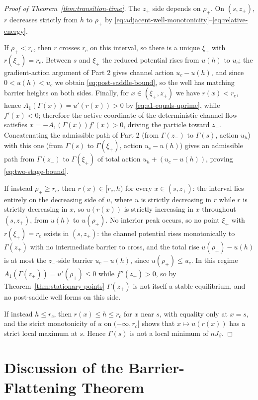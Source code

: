 \documentclass{article} %
\theoremstyle{plain}
\theoremstyle{definition}
\theoremstyle{remark}
\newcommand{\prefactor}[2]{A_{#1}(#2)}
\begin{document}
\begin{proof}[Proof of Theorem~\ref{thm:transition-time}]
    The $z_+$ side depends on $\rho_+$. On $(s,z_+)$, $r$ decreases strictly from $h$ to $\rho_+$ by \eqref{eq:adjacent-well-monotonicity}--\eqref{eq:relative-energy}.

    If $\rho_+<r_c$, then $r$ crosses $r_c$ on this interval, so there is a unique $\xi_+$ with $r(\xi_+)=r_c$. Between $s$ and $\xi_+$ the reduced potential rises from $u(h)$ to $u_c$; the gradient-action argument of Part 2 gives channel action $u_c-u(h)$, and since $0<u(h)<u_c$ we obtain \eqref{eq:post-saddle-bound}, so the well has matching barrier heights on both sides. Finally, for $x\in(\xi_+,z_+)$ we have $r(x)<r_c$, hence $\prefactor{1}{\Gamma(x)}=u'(r(x))>0$ by \eqref{eq:a1-equals-uprime}, while $f'(x)<0$; therefore the active coordinate of the deterministic channel flow satisfies $\dot x=-\prefactor{1}{\Gamma(x)}f'(x)>0$, driving the particle toward $z_+$. Concatenating the admissible path of Part 2 (from $\Gamma(z_-)$ to $\Gamma(s)$, action $u_h$) with this one (from $\Gamma(s)$ to $\Gamma(\xi_+)$, action $u_c-u(h)$) gives an admissible path from $\Gamma(z_-)$ to $\Gamma(\xi_+)$ of total action $u_h+(u_c-u(h))$, proving \eqref{eq:two-stage-bound}.

    If instead $\rho_+\ge r_c$, then $r(x)\in[r_c,h)$ for every $x\in(s,z_+)$: the interval lies entirely on the decreasing side of $u$, where $u$ is strictly decreasing in $r$ while $r$ is strictly decreasing in $x$, so $u(r(x))$ is strictly increasing in $x$ throughout $(s,z_+)$, from $u(h)$ to $u(\rho_+)$. No interior peak occurs, so no point $\xi_+$ with $r(\xi_+)=r_c$ exists in $(s,z_+)$: the channel potential rises monotonically to $\Gamma(z_+)$ with no intermediate barrier to cross, and the total rise $u(\rho_+)-u(h)$ is at most the $z_-$-side barrier $u_c-u(h)$, since $u(\rho_+)\le u_c$. In this regime $\prefactor{1}{\Gamma(z_+)}=u'(\rho_+)\le0$ while $f''(z_+)>0$, so by Theorem~\ref{thm:stationary-points} $\Gamma(z_+)$ is not itself a stable equilibrium, and no post-saddle well forms on this side.

    If instead $h\le r_c$, then $r(x)\le h\le r_c$ for $x$ near $s$, with equality only at $x=s$, and the strict monotonicity of $u$ on $(-\infty,r_c]$ shows that $x\mapsto u(r(x))$ has a strict local maximum at $s$. Hence $\Gamma(s)$ is not a local minimum of $nJ_\beta$.
\end{proof}


\section{Discussion of the Barrier-Flattening Theorem}
\label{apx:barrier-discussion}
\end{document}
